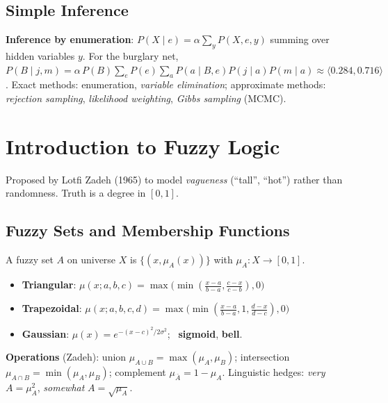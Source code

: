 \subsection{Simple Inference}
\textbf{Inference by enumeration}: $P(X\mid e)=\alpha\sum_{y}P(X,e,y)$ summing over hidden variables $y$. For the burglary net, $P(B\mid j,m)=\alpha\,P(B)\sum_{e}P(e)\sum_{a}P(a\mid B,e)P(j\mid a)P(m\mid a)\approx\langle0.284,0.716\rangle$. Exact methods: enumeration, \emph{variable elimination}; approximate methods: \emph{rejection sampling}, \emph{likelihood weighting}, \emph{Gibbs sampling} (MCMC).

\section{Introduction to Fuzzy Logic}
Proposed by Lotfi Zadeh (1965) to model \emph{vagueness} (``tall'', ``hot'') rather than randomness. Truth is a degree in $[0,1]$.
\subsection{Fuzzy Sets and Membership Functions}
A fuzzy set $A$ on universe $X$ is $\{(x,\mu_A(x))\}$ with $\mu_A:X\to[0,1]$.
\begin{itemize}
\item \textbf{Triangular}: $\mu(x;a,b,c)=\max\!\bigl(\min(\tfrac{x-a}{b-a},\tfrac{c-x}{c-b}),0\bigr)$
\item \textbf{Trapezoidal}: $\mu(x;a,b,c,d)=\max\!\bigl(\min(\tfrac{x-a}{b-a},1,\tfrac{d-x}{d-c}),0\bigr)$
\item \textbf{Gaussian}: $\mu(x)=e^{-(x-c)^2/2\sigma^2}$; \ \textbf{sigmoid}, \textbf{bell}.
\end{itemize}
\begin{center}
\end{center}
\textbf{Operations} (Zadeh): union $\mu_{A\cup B}=\max(\mu_A,\mu_B)$; intersection $\mu_{A\cap B}=\min(\mu_A,\mu_B)$; complement $\mu_{\bar A}=1-\mu_A$. Linguistic hedges: \emph{very} $A=\mu_A^{2}$, \emph{somewhat} $A=\sqrt{\mu_A}$.

